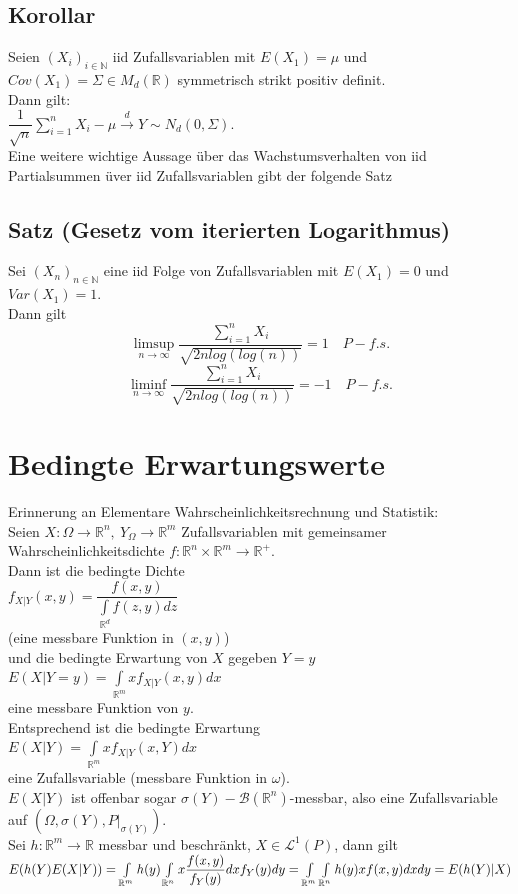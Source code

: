 \documentclass[german,10pt,oneside, fleqn, a4paper]{article}
\newcommand {\R}	{\mathbb{R}}
\newcommand {\N}	{\mathbb{N}}
\newcommand{\ra}{\rightarrow}
\newcommand{\lsup}[1][n]{\limsup\limits_{#1\rightarrow\infty}}
\newcommand{\linf}[1][n]{\liminf\limits_{#1\rightarrow\infty}}
\newcommand{\sm}[2][\infty]{\sum\limits_{#2}^{#1}}
\newcommand{\folge}[3][\N]{\left(#2_#3\right)_{#3\in #1}}
\newcommand{\mc}[1]{\mathcal{#1}}
\newcommand{\lp}[1]{\mc{L}^{#1}}
\newcommand{\1}[1]{1_{#1}}
\newcommand{\2}[1]{\1{\brac{#1}}}
\newcommand{\xr}[2][]{\xrightarrow[#1]{#2}}
\begin{document}
\subsection{Korollar}
\label{5.12}
Seien $\folge{X}{i}$ iid Zufallsvariablen mit $E(X_1)=\mu$ und $Cov(X_1)=\Sigma\in M_d(\R)$ symmetrisch strikt positiv definit.\\
Dann gilt:\\
$\dfrac{1}{\sqrt{n}}\sm[n]{i=1}{X_i-\mu}\xr{d}Y\sim N_d(0,\Sigma).$\\
Eine weitere wichtige Aussage über das Wachstumsverhalten von iid Partialsummen üver iid Zufallsvariablen gibt der folgende Satz

\subsection{Satz (Gesetz vom iterierten Logarithmus)}
\label{5.13}
Sei $\folge{X}{n}$ eine iid Folge von Zufallsvariablen mit $E(X_1)=0$ und $Var(X_1)=1$.\\
Dann gilt
\[\lsup\dfrac{\sm[n]{i=1}X_i}{\sqrt{2nlog(log(n))}}=1\quad P-f.s.\]
\[\linf\dfrac{\sm[n]{i=1}X_i}{\sqrt{2nlog(log(n))}}=-1\quad P-f.s.\]







\section{Bedingte Erwartungswerte}
Erinnerung an Elementare Wahrscheinlichkeitsrechnung und Statistik:\\
Seien $X:\Omega\ra\R^n,\ Y_\Omega\ra\R^m$ Zufallsvariablen mit gemeinsamer Wahrscheinlichkeitsdichte $f:\R^n\times\R^m\ra\R^+$.\\
Dann ist die bedingte Dichte\\
$f_{X|Y}(x,y)=\dfrac{f(x,y)}{\int\limits_{\R^d}f(z,y)dz}$\\
(eine messbare Funktion in $(x,y)$)\\
und die bedingte Erwartung von $X$ gegeben $Y=y$\\
$E(X|Y=y)=\int\limits_{\R^m}xf_{X|Y}(x,y)dx$\\
eine messbare Funktion von $y$.\\
Entsprechend ist die bedingte Erwartung \\
$E(X|Y)=\int\limits_{\R^m}xf_{X|Y}(x,Y)dx$\\
eine Zufallsvariable (messbare Funktion in $\omega$).\\
$E(X|Y)$ ist offenbar sogar $\sigma(Y)-\mc{B}(\R^n)$-messbar, also eine Zufallsvariable auf $(\Omega,\sigma(Y),P|_{\sigma(Y)})$.\\
Sei $h:\R^m\ra\R$ messbar und beschränkt, $X\in\lp{1}(P)$, dann gilt\\
$E(h(Y)E(X|Y))=\int\limits_{\R^m}h(y)\int\limits_{\R^n}x\dfrac{f(x,y)}{f_Y(y)}dxf_Y(y)dy\\
=\int\limits_{\R^m}\int\limits_{\R^n}h(y)xf(x,y)dxdy=E(h(Y)|X)$
\end{document}
